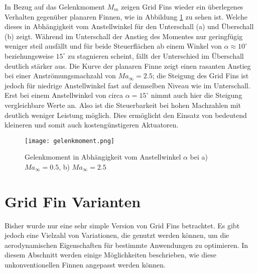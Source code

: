 In Bezug auf das Gelenkmoment $M_m$ zeigen Grid Fins wieder ein überlegenes Verhalten gegenüber planaren Finnen, wie in Abbildung \ref{abb_Mm-AoA} zu sehen ist. Welche dieses in Abhängigkeit vom Anstellwinkel für den Unterschall (a) und Überschall (b) zeigt. Während im Unterschall der Anstieg des Momentes nur geringfügig weniger steil ausfällt und für beide Steuerflächen ab einem Winkel von $\alpha \approx 10^\circ$ beziehungsweise $15^\circ$ zu stagnieren scheint, fällt der Unterschied im Überschall deutlich stärker aus. Die Kurve der planaren Finne zeigt einen rasanten Anstieg bei einer Anströmungsmachzahl von $Ma_\infty = 2.5$; die Steigung des Grid Fins ist jedoch für niedrige Anstellwinkel fast auf demselben Niveau wie im Unterschall. Erst bei einem Anstellwinkel von circa $\alpha = 15^\circ$ nimmt auch hier die Steigung vergleichbare Werte an. Also ist die Steuerbarkeit bei hohen Machzahlen mit deutlich weniger Leistung möglich. Dies ermöglicht den Einsatz von bedeutend kleineren und somit auch kostengünstigeren Aktuatoren. 
\begin{figure}[h]
	\centering
	\texttt{[image: gelenkmoment.png]}
	\begin{flushright}
	\end{flushright}
	\caption{Gelenkmoment in Abhängigkeit vom Anstellwinkel $\alpha$ bei a) \ensuremath{Ma_\infty=0.5}, b) $Ma_\infty=2.5$}
	\label{abb_Mm-AoA}
\end{figure}

\section{Grid Fin Varianten}
Bisher wurde nur eine sehr simple Version von Grid Fins betrachtet. Es gibt jedoch eine Vielzahl von Variationen, die genutzt werden können, um die aerodynamischen Eigenschaften für bestimmte Anwendungen zu optimieren. In diesem Abschnitt werden einige Möglichkeiten beschrieben, wie diese unkonventionellen Finnen angepasst werden können.

